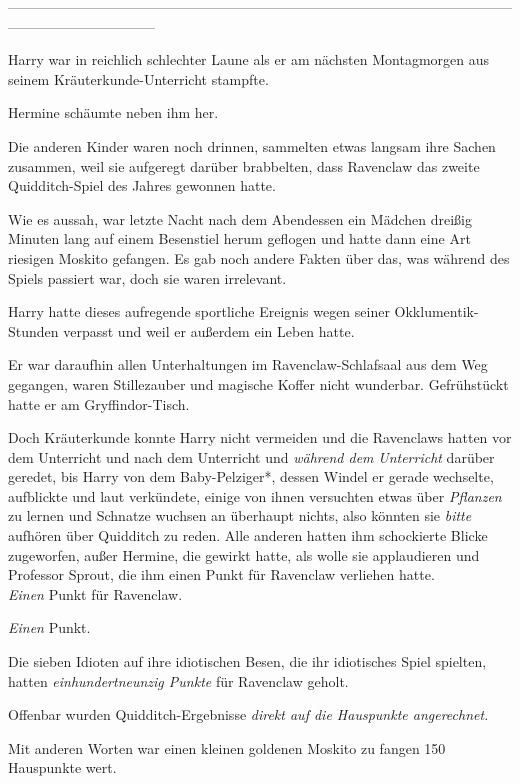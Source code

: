 {--------------------------------------------------------------------------------------------------------------------------------------------

Harry war in reichlich schlechter Laune als er am nächsten Montagmorgen aus seinem Kräuterkunde-Unterricht stampfte.

Hermine schäumte neben ihm her.

Die anderen Kinder waren noch drinnen, sammelten etwas langsam ihre Sachen zusammen, weil sie aufgeregt darüber brabbelten, dass Ravenclaw das zweite Quidditch-Spiel des Jahres gewonnen hatte.

Wie es aussah, war letzte Nacht nach dem Abendessen ein Mädchen dreißig Minuten lang auf einem Besenstiel herum geflogen und hatte dann eine Art riesigen Moskito gefangen. Es gab noch andere Fakten über das, was während des Spiels passiert war, doch sie waren irrelevant.

Harry hatte dieses aufregende sportliche Ereignis wegen seiner Okklumentik-Stunden verpasst und weil er außerdem ein Leben hatte.

Er war daraufhin allen Unterhaltungen im Ravenclaw-Schlafsaal aus dem Weg gegangen, waren Stillezauber und magische Koffer nicht wunderbar. Gefrühstückt hatte er am Gryffindor-Tisch.

Doch Kräuterkunde konnte Harry nicht vermeiden und die Ravenclaws hatten vor dem Unterricht und nach dem Unterricht und \emph{während dem} \emph{Unterricht} darüber geredet, bis Harry von dem Baby-Pelziger*, dessen Windel er gerade wechselte, aufblickte und laut verkündete, einige von ihnen versuchten etwas über \emph{Pflanzen} zu lernen und Schnatze wuchsen an überhaupt nichts, also könnten sie \emph{bitte} aufhören über Quidditch zu reden. Alle anderen hatten ihm schockierte Blicke zugeworfen, außer Hermine, die gewirkt hatte, als wolle sie applaudieren und Professor Sprout, die ihm einen Punkt für Ravenclaw verliehen hatte.\\ \emph{Einen} Punkt für Ravenclaw.

\emph{Einen} Punkt.

Die sieben Idioten auf ihre idiotischen Besen, die ihr idiotisches Spiel spielten, hatten \emph{einhundertneunzig Punkte} für Ravenclaw geholt.

Offenbar wurden Quidditch-Ergebnisse \emph{direkt auf die Hauspunkte angerechnet.}

Mit anderen Worten war einen kleinen goldenen Moskito zu fangen 150 Hauspunkte wert.

}
